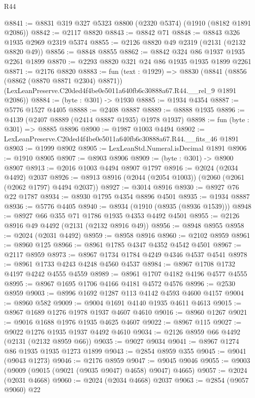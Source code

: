 \begin{lexlean}{R44}
\begin{coremodule}
@8841 := @8831 @319 @327 @5323 @8800 (@2320 @5374) (@1910 (@8182 @1891 @2086))
@8842 := @2117 @8820
@8843 := @8842 @71
@8848 := @8843 @326 @1935 @2969 @2319 @5374
@8855 := @2126 @8820 @49 @2319 (@2131 (@2132 @8820 @49))
@8856 := @8848 @8855
@8862 := @8842 @324 @86 @1937 @1935 @2261 @1899
@8870 := @2293 @8820 @321 @24 @86 @1935 @1935 @1899 @2261
@8871 := @2176 @8820
@8883 := fun (text : @1929) =>
  @8830
    (@8841
      (@8856 (@8862 (@8870 @8871 @2304) @8871))
      (LexLeanPreserve.C20ded4f4be0e5011a640fb6c30888a67.R44.__rel_9 @1891 @2086))
@8884 := (byte : @301) -> @1930
@8885 := @1934 @4354
@8887 := @5776 @1527 @4405
@8888 := @2408 @8887
@8889 := @8888 @1935
@8896 := @4139 (@2407 @8889 (@2414 @8887 @1935) @1978 @1937)
@8898 := fun (byte : @301) => @8885 @8896
@8900 := @1987 @1003 @4494
@8902 := LexLeanPreserve.C20ded4f4be0e5011a640fb6c30888a67.R44.__fits_46 @1891
@8903 := @1999 @8902
@8905 := LexLeanStd.Numeral.isDecimal @1891
@8906 := @1910 @8905
@8907 := @8903 @8906
@8909 := (byte : @301) -> @8900 @8907
@8913 := @2016 @1003 @4494 @8907 @1797
@8916 := @2024 (@2034 @4492) @2037
@8926 := @8913 @8916 (@2044 (@2054 @1003)) (@2060 (@2061 (@2062 @1797) @4494 @2037))
@8927 := @3014 @8916
@8930 := @8927 @76 @22 @1787
@8934 := @8930 @1795 @4354 @8896 @4501
@8935 := @1934 @8887
@8936 := @5776 @4405
@8940 := @8934 (@1910 (@8935 (@8936 @1539)))
@8948 := @8927 @66 @355 @71 @1786 @1935 @4353 @4492 @4501
@8955 := @2126 @8916 @49 @4492 (@2131 (@2132 @8916 @49))
@8956 := @8948 @8955
@8958 := @2024 (@2031 @4492)
@8959 := @8958 @8916
@8960 := @2102 @8959
@8961 := @8960 @125
@8966 := @8961 @1785 @4347 @4352 @4542 @4501
@8967 := @2117 @8959
@8973 := @8967 @1734 @1784 @4249 @4346 @4537 @4541
@8978 := @8961 @1733 @4243 @4248 @4560 @4537
@8984 := @8967 @1708 @1732 @4197 @4242 @4555 @4559
@8989 := @8961 @1707 @4182 @4196 @4577 @4555
@8995 := @8967 @1695 @1706 @4166 @4181 @4572 @4576
@8996 := @2530 @8959
@9003 := @8996 @1692 @1287 @113 @4142 @4593 @4600 @4157
@9004 := @8960 @582
@9009 := @9004 @1691 @4140 @1935 @4611 @4613
@9015 := @8967 @1689 @1276 @1978 @1937 @4607 @4610
@9016 := @8960 @1267
@9021 := @9016 @1688 @1976 @1935 @4625 @4607
@9022 := @8967 @115
@9027 := @9022 @1276 @1935 @1937 @4492 @4610
@9034 := @2126 @8959 @66 @4492 (@2131 (@2132 @8959 @66))
@9035 := @9027 @9034
@9041 := @8967 @1274 @86 @1935 @1935 @1273 @1899
@9043 := @2854 @8959 @355
@9045 := @9041 (@9043 @1273)
@9046 := @2176 @8959
@9047 := @9045 @9046
@9055 := @9003 (@9009 (@9015 (@9021 (@9035 @9047) @4658) @9047) @4665)
@9057 := @2024 (@2031 @4668)
@9060 := @2024 (@2034 @4668) @2037
@9063 := @2854 (@9057 @9060) @22

\end{coremodule}
\end{lexlean}
